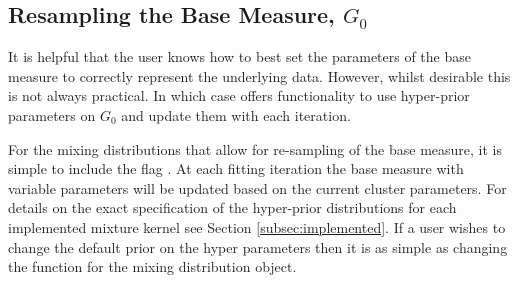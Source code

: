 \documentclass[nojss]{jss}
\begin{document}

\subsection{Resampling the Base Measure, $G_0$}
It is helpful that the user knows how to best set the parameters of the base measure to correctly represent the underlying data. However, whilst desirable this is not always practical. In which case  offers functionality to use hyper-prior parameters on $G_0$ and update them with each iteration.

For the mixing distributions that allow for re-sampling of the base measure, it is simple to include the flag . At each fitting iteration the base measure with variable parameters will be updated based on the current cluster parameters. For details on the exact specification of the hyper-prior distributions for each implemented mixture kernel see Section \ref{subsec:implemented}.  If a user wishes to change the default prior on the hyper parameters then it is as simple as changing the  function for the mixing distribution object.



\end{document}
